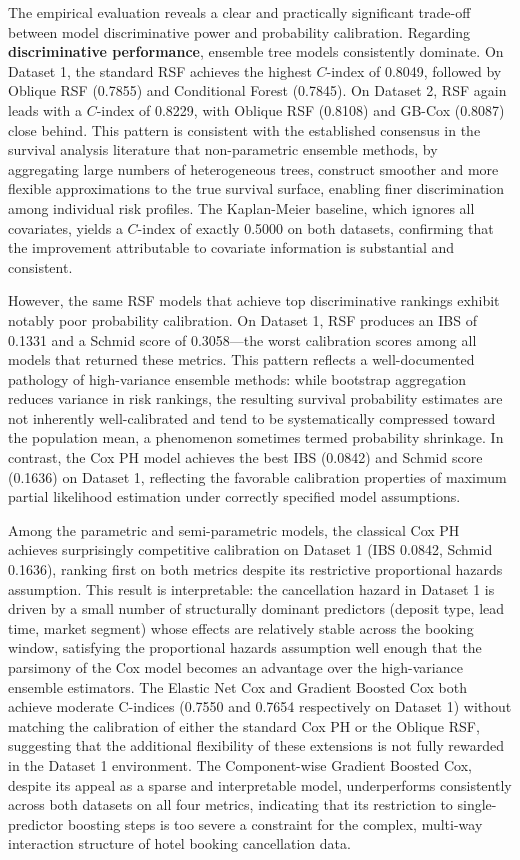 \documentclass[pdflatex,sn-mathphys-ay]{sn-jnl}
\theoremstyle{thmstyleone}%
\theoremstyle{thmstyletwo}%
\theoremstyle{thmstylethree}%
\begin{document}
The empirical evaluation reveals a clear and practically significant trade-off between model discriminative power and probability calibration. Regarding \textbf{discriminative performance}, ensemble tree models consistently dominate. On Dataset 1, the standard RSF achieves the highest $C$-index of 0.8049, followed by Oblique RSF (0.7855) and Conditional Forest (0.7845). On Dataset 2, RSF again leads with a $C$-index of 0.8229, with Oblique RSF (0.8108) and GB-Cox (0.8087) close behind. This pattern is consistent with the established consensus in the survival analysis literature that non-parametric ensemble methods, by aggregating large numbers of heterogeneous trees, construct smoother and more flexible approximations to the true survival surface, enabling finer discrimination among individual risk profiles. The Kaplan-Meier baseline, which ignores all covariates, yields a $C$-index of exactly 0.5000 on both datasets, confirming that the improvement attributable to covariate information is substantial and consistent.

However, the same RSF models that achieve top discriminative rankings exhibit notably poor probability calibration. On Dataset 1, RSF produces an IBS of 0.1331 and a Schmid score of 0.3058—the worst calibration scores among all models that returned these metrics. This pattern reflects a well-documented pathology of high-variance ensemble methods: while bootstrap aggregation reduces variance in risk rankings, the resulting survival probability estimates are not inherently well-calibrated and tend to be systematically compressed toward the population mean, a phenomenon sometimes termed probability shrinkage. In contrast, the Cox PH model achieves the best IBS (0.0842) and Schmid score (0.1636) on Dataset 1, reflecting the favorable calibration properties of maximum partial likelihood estimation under correctly specified model assumptions.

Among the parametric and semi-parametric models, the classical Cox PH achieves surprisingly competitive calibration on Dataset 1 (IBS 0.0842, Schmid 0.1636), ranking first on both metrics despite its restrictive proportional hazards assumption. This result is interpretable: the cancellation hazard in Dataset 1 is driven by a small number of structurally dominant predictors (deposit type, lead time, market segment) whose effects are relatively stable across the booking window, satisfying the proportional hazards assumption well enough that the parsimony of the Cox model becomes an advantage over the high-variance ensemble estimators. The Elastic Net Cox and Gradient Boosted Cox both achieve moderate C-indices (0.7550 and 0.7654 respectively on Dataset 1) without matching the calibration of either the standard Cox PH or the Oblique RSF, suggesting that the additional flexibility of these extensions is not fully rewarded in the Dataset 1 environment. The Component-wise Gradient Boosted Cox, despite its appeal as a sparse and interpretable model, underperforms consistently across both datasets on all four metrics, indicating that its restriction to single-predictor boosting steps is too severe a constraint for the complex, multi-way interaction structure of hotel booking cancellation data.
\end{document}
